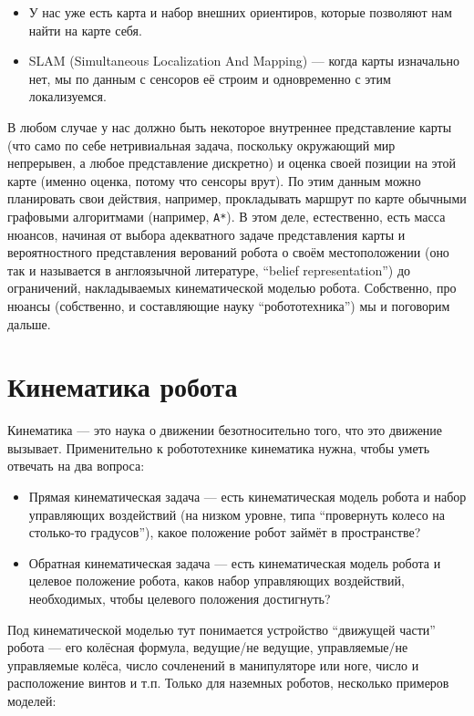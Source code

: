 \documentclass{../../text-style}
\begin{document}
\begin{itemize}
    \item У нас уже есть карта и набор внешних ориентиров, которые позволяют нам найти на карте себя.
    \item SLAM (Simultaneous Localization And Mapping) --- когда карты изначально нет, мы по данным с сенсоров её строим и одновременно с этим локализуемся.
\end{itemize}

В любом случае у нас должно быть некоторое внутреннее представление карты (что само по себе нетривиальная задача, поскольку окружающий мир непрерывен, а любое представление дискретно) и оценка своей позиции на этой карте (именно оценка, потому что сенсоры врут).
По этим данным можно планировать свои действия, например, прокладывать маршрут по карте обычными графовыми алгоритмами (например, \texttt{A*}).
В этом деле, естественно, есть масса нюансов, начиная от выбора адекватного задаче представления карты и вероятностного представления верований робота о своём местоположении (оно так и называется в англоязычной литературе, \foreignquote{english}{belief representation}) до ограничений, накладываемых кинематической моделью робота.
Собственно, про нюансы (собственно, и составляющие науку \enquote{робототехника}) мы и поговорим дальше.

\section{Кинематика робота}

Кинематика --- это наука о движении безотносительно того, что это движение вызывает. Применительно к робототехнике кинематика нужна, чтобы уметь отвечать на два вопроса:

\begin{itemize}
    \item Прямая кинематическая задача --- есть кинематическая модель робота и набор управляющих воздействий (на низком уровне, типа \enquote{провернуть колесо на столько-то градусов}), какое положение робот займёт в пространстве?
    \item Обратная кинематическая задача --- есть кинематическая модель робота и целевое положение робота, каков набор управляющих воздействий, необходимых, чтобы целевого положения достигнуть?
\end{itemize}

Под кинематической моделью тут понимается устройство \enquote{движущей части} робота --- его колёсная формула, ведущие/не ведущие, управляемые/не управляемые колёса, число сочленений в манипуляторе или ноге, число и расположение винтов и т.п.
Только для наземных роботов, несколько примеров моделей:
\end{document}
